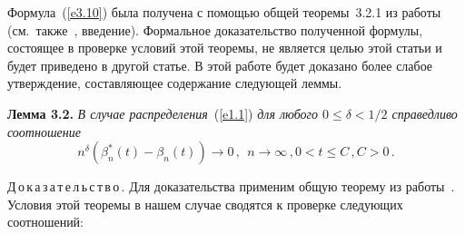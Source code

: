 \begin{multicols}{2}
Формула~(\ref{e3.10}) была получена с помощью общей теоремы~3.2.1
из работы~\cite{1be} (см.\ также~\cite{6be}, введение).
Формальное доказательство полученной формулы, состоящее в
проверке условий этой теоремы, не является целью этой статьи и будет приведено
в другой статье.
В этой работе будет доказано более слабое утверждение,
составляющее содержание следующей леммы.

\smallskip

\noindent
\textbf{Лемма 3.2.} {\it В случае распределения}~(\ref{e1.1}) {\it для
любого $0 \le \delta < 1/2$ справедливо соотношение
$$
n^{\delta}\left(\beta_n^*(t)-\beta_n(t)\right) \to  0\,,\ \ 
 n \to \infty\,,
  0 < t\le C\,,   C>0\,.
$$
}

\smallskip

\noindent
Д\,о\,к\,а\,з\,а\,т\,е\,л\,ь\,с\,т\,в\,о\,.
Для доказательства применим общую теорему из работы~\cite{3be}. Условия
этой теоремы в нашем случае сводятся к проверке следующих
соотношений:


\end{multicols}
